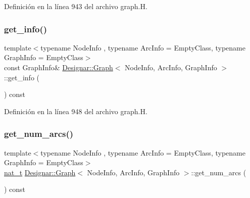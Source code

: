 Definición en la línea 943 del archivo graph.\+H.

\mbox{\label{class_designar_1_1_graph_adfbae301b6a211adaf1919bc41db176a}} 
\subsubsection{\texorpdfstring{get\+\_\+info()}{get\_info()}\hspace{0.1cm}{\footnotesize\ttfamily [2/2]}}
{\footnotesize\ttfamily template$<$typename Node\+Info , typename Arc\+Info  = Empty\+Class, typename Graph\+Info  = Empty\+Class$>$ \\
const Graph\+Info\& \hyperlink{class_designar_1_1_graph}{Designar\+::\+Graph}$<$ Node\+Info, Arc\+Info, Graph\+Info $>$\+::get\+\_\+info (\begin{DoxyParamCaption}{ }\end{DoxyParamCaption}) const\hspace{0.3cm}{\ttfamily [inline]}}



Definición en la línea 948 del archivo graph.\+H.

\mbox{\label{class_designar_1_1_graph_a5b155eda66a4c90f6a34b25c80d9342b}} 
\subsubsection{\texorpdfstring{get\+\_\+num\+\_\+arcs()}{get\_num\_arcs()}}
{\footnotesize\ttfamily template$<$typename Node\+Info , typename Arc\+Info  = Empty\+Class, typename Graph\+Info  = Empty\+Class$>$ \\
\hyperlink{namespace_designar_aa72662848b9f4815e7bf31a7cf3e33d1}{nat\+\_\+t} \hyperlink{class_designar_1_1_graph}{Designar\+::\+Graph}$<$ Node\+Info, Arc\+Info, Graph\+Info $>$\+::get\+\_\+num\+\_\+arcs (\begin{DoxyParamCaption}{ }\end{DoxyParamCaption}) const\hspace{0.3cm}{\ttfamily [inline]}}



